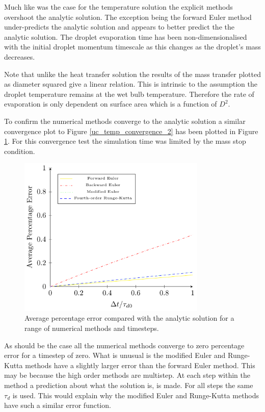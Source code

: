 \documentclass[../Interim_Report_Master]{subfiles}
\begin{document}
Much like was the case for the temperature solution the explicit methods overshoot the analytic solution. The exception being the forward Euler method under-predicts the analytic solution and appears to better predict the the analytic solution. The droplet evaporation time has been non-dimensionalised with the initial droplet momentum timescale as this changes as the droplet's mass decreases.

Note that unlike the heat transfer solution the results of the mass transfer plotted as diameter squared give a linear relation. This is intrinsic to the assumption the droplet temperature remains at the wet bulb temperature. Therefore the rate of evaporation is only dependent on surface area which is a function of $D^2$.

To confirm the numerical methods converge to the analytic solution a similar convergence plot to Figure \ref{uc_temp_convergence_2} has been plotted in Figure \ref{uc_d2_convergence}. For this convergence test the simulation time was limited by the mass stop condition.
\begin{figure}[h]
	\centering
	\includegraphics[width=0.8\textwidth]{./Diagrams/Uncoupled_D2_Convergence/Uncoupled_D2_Convergence.pdf}
	\caption{Average percentage error compared with the analytic solution for a range of numerical methods and timesteps.}
	\label{uc_d2_convergence}
\end{figure}

As should be the case all the numerical methods converge to zero percentage error for a timestep of zero. What is unusual is the modified Euler and Runge-Kutta methods have a slightly larger error than the forward Euler method. This may be because the high order methods are multistep. At each step within the method a prediction about what the solution is, is made. For all steps the same $\tau_d$ is used. This would explain why the modified Euler and Runge-Kutta methods have such a similar error function.
\end{document}
